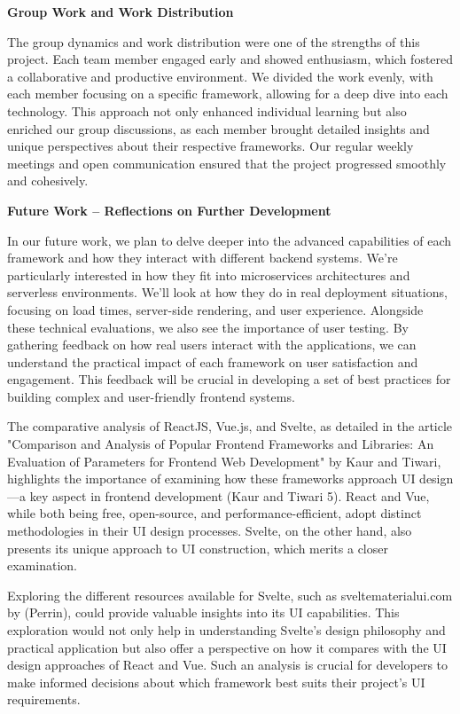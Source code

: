 \textbf{Group Work and Work Distribution}

The group dynamics and work distribution were one of the strengths of this project. Each team member engaged early and showed enthusiasm, which fostered a collaborative and productive environment. We divided the work evenly, with each member focusing on a specific framework, allowing for a deep dive into each technology. This approach not only enhanced individual learning but also enriched our group discussions, as each member brought detailed insights and unique perspectives about their respective frameworks. Our regular weekly meetings and open communication ensured that the project progressed smoothly and cohesively.

\textbf{Future Work – Reflections on Further Development}

In our future work, we plan to delve deeper into the advanced capabilities of each framework and how they interact with different backend systems. We're particularly interested in how they fit into microservices architectures and serverless environments. We'll look at how they do in real deployment situations, focusing on load times, server-side rendering, and user experience. Alongside these technical evaluations, we also see the importance of user testing. By gathering feedback on how real users interact with the applications, we can understand the practical impact of each framework on user satisfaction and engagement. This feedback will be crucial in developing a set of best practices for building complex and user-friendly frontend systems.


The comparative analysis of ReactJS, Vue.js, and Svelte, as detailed in the article "Comparison and Analysis of Popular Frontend Frameworks and Libraries: An Evaluation of Parameters for Frontend Web Development" by Kaur and Tiwari, highlights the importance of examining how these frameworks approach UI design—a key aspect in frontend development (Kaur and Tiwari 5). React and Vue, while both being free, open-source, and performance-efficient, adopt distinct methodologies in their UI design processes. Svelte, on the other hand, also presents its unique approach to UI construction, which merits a closer examination.

Exploring the different resources available for Svelte, such as sveltematerialui.com by (Perrin), could provide valuable insights into its UI capabilities. This exploration would not only help in understanding Svelte’s design philosophy and practical application but also offer a perspective on how it compares with the UI design approaches of React and Vue. Such an analysis is crucial for developers to make informed decisions about which framework best suits their project's UI requirements.
